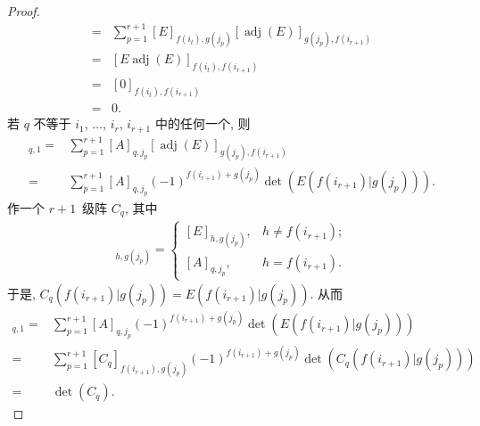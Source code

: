 \begin{proof}
\begin{align*}
        = {} &
        \sum_{p=1}^{r+1}
        {[E]_{f(i_t),g(j_p)}
            [\operatorname{adj} {(E)}]_{g(j_p),f(i_{r+1})}}
        \\
        = {} &
        [E \operatorname{adj} {(E)}]_{f(i_t),f(i_{r+1})}
        \\
        = {} &
        [0]_{f(i_t),f(i_{r+1})}
        \\
        = {} & 0.
    \end{align*}
    若 \(q\) 不等于
    \(i_1\), \(\dots\), \(i_r\), \(i_{r+1}\)
    中的任何一个,
    则
    \begin{align*}
        [AW]_{q,1}
        = {} &
        \sum_{p=1}^{r+1}
        {[A]_{q,j_p}
            [\operatorname{adj} {(E)}]_{g(j_p),f(i_{r+1})}}
        \\
        = {} &
        \sum_{p=1}^{r+1}
        {[A]_{q,j_p}
        (-1)^{f(i_{r+1})+g(j_p)}
        \det {(E(f(i_{r+1})|g(j_p)))}}.
    \end{align*}
    作一个 \(r+1\)~级阵 \(C_q\), 其中
    \begin{align*}
        [C_q]_{h,g(j_p)}
        = \begin{cases}
              [E]_{h,g(j_p)},
               & h \neq f(i_{r+1}); \\
              [A]_{q,j_p},
               & h = f(i_{r+1}).
          \end{cases}
    \end{align*}
    于是, \(C_q(f(i_{r+1})|g(j_p))
    = E(f(i_{r+1})|g(j_p))\).
    从而
    \begin{align*}
        [AW]_{q,1}
        = {} &
        \sum_{p=1}^{r+1}
        {[A]_{q,j_p}
        (-1)^{f(i_{r+1})+g(j_p)}
        \det {(E(f(i_{r+1})|g(j_p)))}}
        \\
        = {} &
        \sum_{p=1}^{r+1}
        {[C_q]_{f(i_{r+1}),g(j_p)}
        (-1)^{f(i_{r+1})+g(j_p)}
        \det {(C_q (f(i_{r+1})|g(j_p)))}}
        \\
        = {} &
        \det {(C_q)}.
    \end{align*}


\end{proof}
